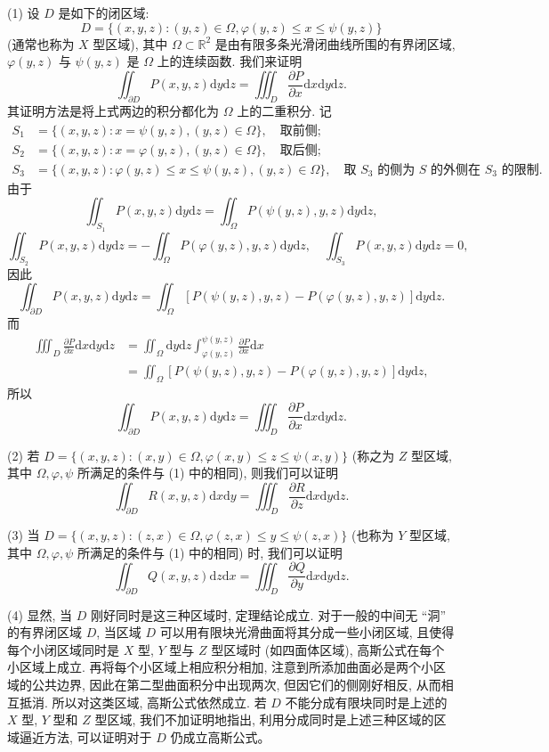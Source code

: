 \documentclass[UTF8, 12pt, fontset=fandol, oneside]{ctexart}
\begin{document}
(1) 设 $D$ 是如下的闭区域:
\[
  D=\{(x,y,z):(y,z)\in\Omega,\varphi(y,z)\le x\le\psi(y,z)\}
\]
(通常也称为 $X$ 型区域), 其中 $\Omega\subset\mathbb R^2$ 是由有限多条光滑闭曲线所围的有界闭区域, $\varphi(y,z)$ 与 $\psi(y,z)$ 是 $\Omega$ 上的连续函数. 我们来证明
\[
  \iint_{\partial D}P(x,y,z)\mathrm dy\mathrm dz
  =\iiint_D\frac{\partial P}{\partial x}\mathrm dx\mathrm dy\mathrm dz.
\]
其证明方法是将上式两边的积分都化为 $\Omega$ 上的二重积分. 记
\[
\begin{aligned}
  S_1&=\{(x,y,z):x=\psi(y,z),(y,z)\in\Omega\},\quad \text{取前侧};\\
  S_2&=\{(x,y,z):x=\varphi(y,z),(y,z)\in\Omega\},\quad \text{取后侧};\\
  S_3&=\{(x,y,z):\varphi(y,z)\le x\le\psi(y,z),(y,z)\in\Omega\},
    \quad \text{取 $S_3$ 的侧为 $S$ 的外侧在 $S_3$ 的限制}.
\end{aligned}
\]
由于
\[
  \iint_{S_1}P(x,y,z)\mathrm dy\mathrm dz
  =\iint_\Omega P(\psi(y,z),y,z)\mathrm dy\mathrm dz,
\]
\[
  \iint_{S_2}P(x,y,z)\mathrm dy\mathrm dz
  =-\iint_\Omega P(\varphi(y,z),y,z)\mathrm dy\mathrm dz,\quad
  \iint_{S_3}P(x,y,z)\mathrm dy\mathrm dz=0,
\]
因此
\[
  \iint_{\partial D}P(x,y,z)\mathrm dy\mathrm dz
  =\iint_\Omega[P(\psi(y,z),y,z)-P(\varphi(y,z),y,z)]\mathrm dy\mathrm dz.
\]
而
\[
\begin{aligned}
  \iiint_D\frac{\partial P}{\partial x}\mathrm dx\mathrm dy\mathrm dz
  &=\iint_\Omega\mathrm dy\mathrm dz
    \int_{\varphi(y,z)}^{\psi(y,z)}\frac{\partial P}{\partial x}\mathrm dx\\
  &=\iint_\Omega[P(\psi(y,z),y,z)-P(\varphi(y,z),y,z)]\mathrm dy\mathrm dz,
\end{aligned}
\]
所以
\[
  \iint_{\partial D}P(x,y,z)\mathrm dy\mathrm dz
  =\iiint_D\frac{\partial P}{\partial x}\mathrm dx\mathrm dy\mathrm dz.
\]

(2) 若 $D=\{(x,y,z):(x,y)\in\Omega,\varphi(x,y)\le z\le\psi(x,y)\}$ (称之为 $Z$ 型区域, 其中 $\Omega,\varphi,\psi$ 所满足的条件与 (1) 中的相同), 则我们可以证明
\[
  \iint_{\partial D}R(x,y,z)\mathrm dx\mathrm dy
  =\iiint_D\frac{\partial R}{\partial z}\mathrm dx\mathrm dy\mathrm dz.
\]

(3) 当 $D=\{(x,y,z):(z,x)\in\Omega,\varphi(z,x)\le y\le\psi(z,x)\}$ (也称为 $Y$ 型区域, 其中 $\Omega,\varphi,\psi$ 所满足的条件与 (1) 中的相同) 时, 我们可以证明
\[
  \iint_{\partial D}Q(x,y,z)\mathrm dz\mathrm dx
  =\iiint_D\frac{\partial Q}{\partial y}\mathrm dx\mathrm dy\mathrm dz.
\]

(4) 显然, 当 $D$ 刚好同时是这三种区域时, 定理结论成立. 对于一般的中间无 ``洞'' 的有界闭区域 $D$, 当区域 $D$ 可以用有限块光滑曲面将其分成一些小闭区域, 且使得每个小闭区域同时是 $X$ 型, $Y$ 型与 $Z$ 型区域时 (如四面体区域), 高斯公式在每个小区域上成立. 再将每个小区域上相应积分相加, 注意到所添加曲面必是两个小区域的公共边界, 因此在第二型曲面积分中出现两次, 但因它们的侧刚好相反, 从而相互抵消. 所以对这类区域, 高斯公式依然成立. 若 $D$ 不能分成有限块同时是上述的 $X$ 型, $Y$ 型和 $Z$ 型区域, 我们不加证明地指出, 利用分成同时是上述三种区域的区域逼近方法, 可以证明对于 $D$ 仍成立高斯公式。
\end{document}
